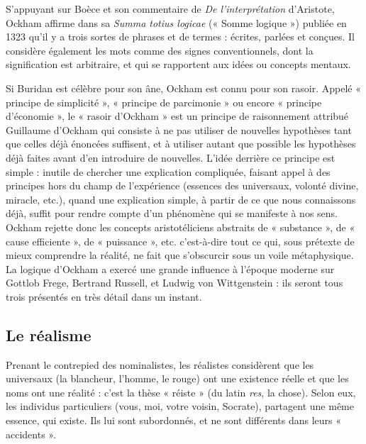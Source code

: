 S’appuyant sur Boèce et son commentaire de \textit{De l’interprétation} d’Aristote, Ockham affirme dans sa \textit{Summa totius logicae} (« Somme logique ») publiée en 1323 qu’il y a trois sortes de phrases et de termes : écrites, parlées et conçues. Il considère également les mots comme des signes conventionnels, dont la signification est arbitraire, et qui se rapportent aux idées ou concepts mentaux.

Si Buridan est célèbre pour son âne, Ockham est connu pour son rasoir. Appelé « principe de simplicité », « principe de parcimonie » ou encore « principe d’économie », le « rasoir d’Ockham » est un principe de raisonnement attribué Guillaume d’Ockham qui consiste à ne pas utiliser de nouvelles hypothèses tant que celles déjà énoncées suffisent, et à utiliser autant que possible les hypothèses déjà faites avant d’en introduire de nouvelles. L’idée derrière ce principe est simple : inutile de chercher une explication compliquée, faisant appel à des principes hors du champ de l’expérience (essences des universaux, volonté divine, miracle, etc.), quand une explication simple, à partir de ce que nous connaissons déjà, suffit pour rendre compte d’un phénomène qui se manifeste à nos sens. Ockham rejette donc les concepts aristotéliciens abstraits de « substance », de « cause efficiente », de « puissance », etc. c’est-à-dire tout ce qui, sous prétexte de mieux comprendre la réalité, ne fait que s’obscurcir sous un voile métaphysique. La logique d’Ockham a exercé une grande influence à l’époque moderne sur Gottlob Frege, Bertrand Russell, et Ludwig von Wittgenstein : ils seront tous trois présentés en très détail dans un instant.

\subsection{Le réalisme}
Prenant le contrepied des nominalistes, les réalistes considèrent que les universaux (la blancheur, l’homme, le rouge) ont une existence réelle et que les noms ont une réalité : c’est la thèse « réiste » (du latin \textit{res}, la chose). Selon eux, les individus particuliers (vous, moi, votre voisin, Socrate), partagent une même essence, qui existe. Ils lui sont subordonnés, et ne sont différents dans leurs « accidents ».

